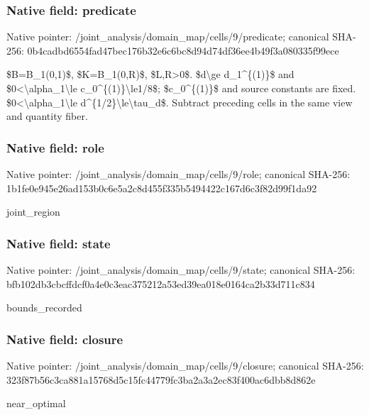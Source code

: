 \documentclass[10pt,a4paper]{article}
\begin{document}
\subsubsection{Native field: predicate}


Native pointer: /joint\_analysis/domain\_m\allowbreak{}ap/cells/9/predicate; canonical SHA-256: 0b4cadbd6554fad47bec176b\allowbreak{}32e6c6bc8d94d74df36ee4b4\allowbreak{}9f3a080335f99ece


\$B=B\_1(0,1)\$, \$K=B\_1(0,R)\$, \$L,R>0\$. \$d\textbackslash{}ge d\_1\textasciicircum{}\{(1)\}\$ and \$0<\textbackslash{}alpha\_1\textbackslash{}le c\_0\textasciicircum{}\{(1)\}\textbackslash{}le1/8\$; \$c\_0\textasciicircum{}\{(1)\}\$ and source constants are fixed. \$0<\textbackslash{}alpha\_1\textbackslash{}le d\textasciicircum{}\{1/2\}\textbackslash{}le\textbackslash{}tau\_d\$. Subtract preceding cells in the same view and quantity fiber.


\subsubsection{Native field: role}


Native pointer: /joint\_analysis/domain\_map/cells/9/role; canonical SHA-256: 1b1fe0e945e26ad153b0c6e5\allowbreak{}a2c8d455f335b5494422c167\allowbreak{}d6c3f82d99f1da92


joint\_region


\subsubsection{Native field: state}


Native pointer: /joint\_analysis/domain\_m\allowbreak{}ap/cells/9/state; canonical SHA-256: bfb102db3cbcffdcf0a4e0c3\allowbreak{}eac375212a53ed39ea018e01\allowbreak{}64ca2b33d711c834


bounds\_recorded


\subsubsection{Native field: closure}


Native pointer: /joint\_analysis/domain\_m\allowbreak{}ap/cells/9/closure; canonical SHA-256: 323f87b56c3ca881a15768d5\allowbreak{}c15fc44779fc3ba2a3a2ec83\allowbreak{}f400ac6dbb8d862e


near\_optimal
\end{document}
